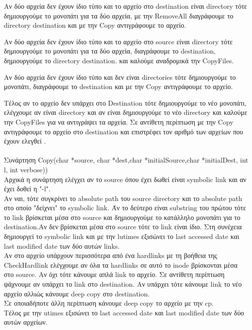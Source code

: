 \documentclass[10pt,a4]{article}
\newcommand{\la}{\latintext}
\begin{document}
\begin{itemize}
	 Αν δύο αρχεία δεν έχουν ίδιο τύπο και το αρχείο στο {\la destination} είναι {\la directory} τότε δημιουργούμε
	 το μονοπάτι για τα δύο αρχεία, με την {\la RemoveAll} διαγράφουμε το {\la directory destination} και με την 
	 {\la Copy} αντιγράφουμε το αρχείο.\
	 
	 Αν δύο αρχεία δεν έχουν ίδιο τύπο και το αρχείο στο {\la source} είναι {\la directory} τότε δημιουργούμε
	 το μονοπάτι για τα δύο αρχεία, διαγράφουμε το {\la destination}, δημιουργούμε το {\la directory destination}.
	 και καλούμε αναδρομικά την {\la CopyFiles}.\
	 
	 Aν δύο αρχεία δεν έχουν ίδιο τύπο και δεν είναι {\la directories} τότε δημιουργούμε το μονοπάτι,
	  διαγράφουμε το {\la destination} και με την {\la Copy} αντιγράφουμε το αρχείο.\
	  
	  Τέλος αν το αρχείο δεν υπάρχει στο {\la Destination} τότε δημιουργούμε το νέο μονοπάτι, ελέγχουμε αν είναι
	  {\la directory} και αν είναι δημιουργούμε το νέο {\la directory} και καλούμε την {\la CopyFiles} για να αντιγράψει
	  τα αρχεία. Σε αντίθετη περίπτωση με την {\la Copy} αντιγράφουμε το αρχείο στο {\la destination}  και επιστρέφει
	  τον αριθμό των αρχείων που έχουν ελεγθεί .\\ \\ 
	  
	  Συνάρτηση {\la Copy(char *source, char *dest,char *initialSource,char *initialDest, int l, int verbose))}\\
	  Αρχικά η συνάρτηση ελέγχει αν το {\la source} όπου έχει δωθεί είναι {\la symbolic link} και αν έχει δοθεί
	  η {\la "-l"}.\\
	  Αν ναι, τότε συγκρίνει το {\la absolute path} του {\la source directory} και το {\la absolute path}
	  στο οποίο "δείχνει" το {\la symbolic link}.  Άν το δεύτερο είναι {\la substring} του πρώτου τότε το {\la link}
	  βρίσκεται μέσα στο {\la source} και δημιουργούμε το κατάλληλο μονοπάτι για το {\la destination}.Αν δεν
	  βρίσκεται μέσα στο {\la source} τότε το {\la link} είναι ίδιο. Στη συνέχεια  δημιουργεί το {\la symbolic link}
	  και με την {\la lutimes} εξισώνει το {\la last accessed date} και {\la last modified date} των δύο αυτών
	  {\la links}.\\
	  Aν στο αρχείο υπάρχουν περισσότερα από ένα {\la hardlinks} με τη βοήθεια της {\la CheckHardlink} ελέγχουμε
	  αν όλα τα {\la hardlinks} σε αυτό το {\la inode} βρίσκονται μέσα στο {\la source}. Αν όχι τότε κάνουμε απλά
	  {\la link} το αρχείο. Σε αντίθετη περίπτωση ψάχνουμε αν υπάρχει το {\la link} στο {\la destination}. Αν
	  υπάρχει τότε κάνουμε {\la link} το νέο αρχείο αλλιώς κάνουμε {\la deep copy} στο {\la destination}.\\
	  Σε οποιαδήποτε άλλη περίπτωση κάνουμε {\la deep copy} το αρχείο με την {\la cp}.\\
	  Τέλος με την {\la utimes} εξισώνει το {\la last accessed date} και {\la last modified date} των δύο αυτών αρχείων.
	  

\end{itemize}
\end{document}
